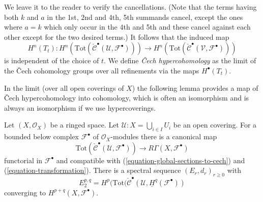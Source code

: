 We leave it to the reader to verify the cancellations. (Note that the
terms having both $k$ and $a$ in the 1st, 2nd and 4th, 5th summands
cancel, except the ones where $a = k$ which only occur in the 4th and 5th
and these cancel against each other except for the two desired terms.)
It follows that the induced map
$$
H^n(T_t) :
H^n(
\text{Tot}(\check{\mathcal{C}}^\bullet({\mathcal U}, {\mathcal F}^\bullet))
)
\to
H^n(
\text{Tot}(\check{\mathcal{C}}^\bullet({\mathcal V}, {\mathcal F}^\bullet))
)
$$
is independent of the choice of $t$. We define
{\it {\v C}ech hypercohomology} as the limit of the
{\v C}ech cohomology groups
over all refinements via the maps $H^\bullet(T_t)$.

\medskip\noindent
In the limit (over all open coverings of $X$) the following lemma provides
a map of {\v C}ech hypercohomology into cohomology, which is often an
isomorphism and is always an isomorphism if we use hypercoverings.

\begin{lemma}
\label{lemma-cech-complex-complex}
Let $(X, \mathcal{O}_X)$ be a ringed space.
Let $\mathcal{U} : X = \bigcup_{i \in I} U_i$ be
an open covering. For a bounded below complex $\mathcal{F}^\bullet$
of $\mathcal{O}_X$-modules there is a canonical map
$$
\text{Tot}(\check{\mathcal{C}}^\bullet(\mathcal{U}, \mathcal{F}^\bullet))
\longrightarrow
R\Gamma(X, \mathcal{F}^\bullet)
$$
functorial in $\mathcal{F}^\bullet$ and compatible with
(\ref{equation-global-sections-to-cech}) and (\ref{equation-transformation}).
There is a spectral sequence $(E_r, d_r)_{r \geq 0}$ with
$$
E_2^{p, q} =
H^p(\text{Tot}(\check{\mathcal{C}}^\bullet(\mathcal{U},
\underline{H}^q(\mathcal{F}^\bullet))
$$
converging to $H^{p + q}(X, \mathcal{F}^\bullet)$.
\end{lemma}


